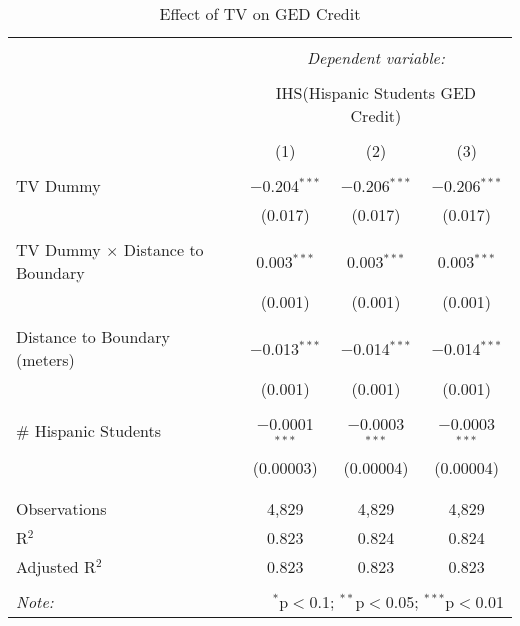 
\begin{table}[!htbp] \centering 
  \caption{Effect of TV on GED Credit} 
  \label{} 
\begin{tabular}{@{\extracolsep{-2pt}}lccc} 
\\[-1.8ex]\hline 
\hline \\[-1.8ex] 
 & \multicolumn{3}{c}{\textit{Dependent variable:}} \\ 
\cline{2-4} 
\\[-1.8ex] & \multicolumn{3}{c}{IHS(Hispanic Students GED Credit)} \\ 
\\[-1.8ex] & (1) & (2) & (3)\\ 
\hline \\[-1.8ex] 
 TV Dummy & $-$0.204$^{***}$ & $-$0.206$^{***}$ & $-$0.206$^{***}$ \\ 
  & (0.017) & (0.017) & (0.017) \\ 
  & & & \\ 
 TV Dummy $\times$ Distance to Boundary & 0.003$^{***}$ & 0.003$^{***}$ & 0.003$^{***}$ \\ 
  & (0.001) & (0.001) & (0.001) \\ 
  & & & \\ 
 Distance to Boundary (meters) & $-$0.013$^{***}$ & $-$0.014$^{***}$ & $-$0.014$^{***}$ \\ 
  & (0.001) & (0.001) & (0.001) \\ 
  & & & \\ 
 \# Hispanic Students & $-$0.0001$^{***}$ & $-$0.0003$^{***}$ & $-$0.0003$^{***}$ \\ 
  & (0.00003) & (0.00004) & (0.00004) \\ 
  & & & \\ 
\hline \\[-1.8ex] 
Observations & 4,829 & 4,829 & 4,829 \\ 
R$^{2}$ & 0.823 & 0.824 & 0.824 \\ 
Adjusted R$^{2}$ & 0.823 & 0.823 & 0.823 \\ 
\hline 
\hline \\[-1.8ex] 
\textit{Note:}  & \multicolumn{3}{r}{$^{*}$p$<$0.1; $^{**}$p$<$0.05; $^{***}$p$<$0.01} \\ 
\end{tabular} 
\end{table} 
